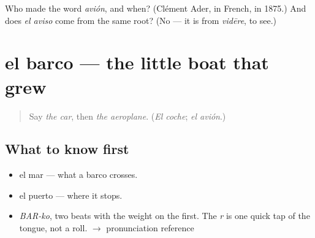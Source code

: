 \begin{tcolorbox}[breakable,colback=teal!4,colframe=teal!35!black,title={Before you move on}]
Who made the word \emph{avión}, and when? (Clément Ader, in French, in 1875.) And does \emph{el aviso} come from the same root? (No — it is from \emph{vidēre}, to see.)
\end{tcolorbox}
\section[el barco]{el barco — the little boat that grew}

\label{lesson:ES-C363-barco}



\begin{quote}
Say \emph{the car}, then \emph{the aeroplane}. (\emph{El coche}; \emph{el avión}.)
\end{quote}

\subsection*{What to know first}
\begin{itemize}
\raggedright
  \item el mar — what a barco crosses.
  \item el puerto — where it stops.
\end{itemize}

\begin{sounds}
\begin{itemize}
\raggedright
  \item \emph{BAR-ko}, two beats with the weight on the first. The \emph{r} is one quick tap of the tongue, not a roll. $\to$ pronunciation reference
\end{itemize}
\end{sounds}

